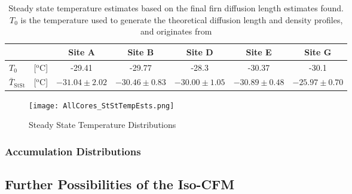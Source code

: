 \documentclass[../../CompleteThesis2/Complete_2ndDraft]{subfiles}
\begin{document}
\begin{table}[ht]
	\centering
	\begin{tabular}{l c|c|c|c|c|c}
		& & Site A & Site B & Site D & Site E & Site G \\
		\hline
		\hline
		$T_0$ & [$^{\text{o}}$C] & -29.41 & -29.77 & -28.3 & -30.37 & -30.1 \\
		$\bar{T}_{\text{StSt}}$ & [$^{\text{o}}$C] & $-31.04 \pm 2.02$ & $-30.46 \pm 0.83$ & $-30.00 \pm 1.05$ & $-30.89 \pm 0.48$ & $-25.97 \pm 0.70$ \\
	\end{tabular}
	\caption[Steady State Temperature Estimates]{\small Steady state temperature estimates based on the final firn diffusion length estimates found. $T_0$ is the temperature used to generate the theoretical diffusion length and density profiles, and originates from \cite[add. text]{keylist}}
\end{table}

\begin{figure}[h]
	\centering
	\texttt{[image: AllCores\_StStTempEsts.png]}
	\caption[Steady State Temperature Distributions]{\small Steady State Temperature Distributions}
	\label{fig:AllCores_StStTempEsts}
\end{figure}



\subsubsection[Accumulation Distributions]{Accumulation Distributions}
\label{Sec:Results_TempEstData_StSt_AccumDists}

\subsection[Iso-CFM Possibilities]{Further Possibilities of the Iso-CFM}
\label{Sec:Results_TempEstData_IsoCFMPossibilities}
\end{document}
